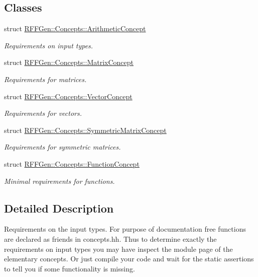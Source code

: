 \subsection*{Classes}
\begin{DoxyCompactItemize}
\item 
struct \hyperlink{structRFFGen_1_1Concepts_1_1ArithmeticConcept}{R\-F\-F\-Gen\-::\-Concepts\-::\-Arithmetic\-Concept}
\begin{DoxyCompactList}\small\item\em Requirements on input types. \end{DoxyCompactList}\item 
struct \hyperlink{structRFFGen_1_1Concepts_1_1MatrixConcept}{R\-F\-F\-Gen\-::\-Concepts\-::\-Matrix\-Concept}
\begin{DoxyCompactList}\small\item\em Requirements for matrices. \end{DoxyCompactList}\item 
struct \hyperlink{structRFFGen_1_1Concepts_1_1VectorConcept}{R\-F\-F\-Gen\-::\-Concepts\-::\-Vector\-Concept}
\begin{DoxyCompactList}\small\item\em Requirements for vectors. \end{DoxyCompactList}\item 
struct \hyperlink{structRFFGen_1_1Concepts_1_1SymmetricMatrixConcept}{R\-F\-F\-Gen\-::\-Concepts\-::\-Symmetric\-Matrix\-Concept}
\begin{DoxyCompactList}\small\item\em Requirements for symmetric matrices. \end{DoxyCompactList}\item 
struct \hyperlink{structRFFGen_1_1Concepts_1_1FunctionConcept}{R\-F\-F\-Gen\-::\-Concepts\-::\-Function\-Concept}
\begin{DoxyCompactList}\small\item\em Minimal requirements for functions. \end{DoxyCompactList}\end{DoxyCompactItemize}


\subsection{Detailed Description}
Requirements on the input types. For purpose of documentation free functions are declared as friends in concepts.\-hh. Thus to determine exactly the requirements on input types you may have inspect the module page of the elementary concepts. Or just compile your code and wait for the static assertions to tell you if some functionality is missing. 